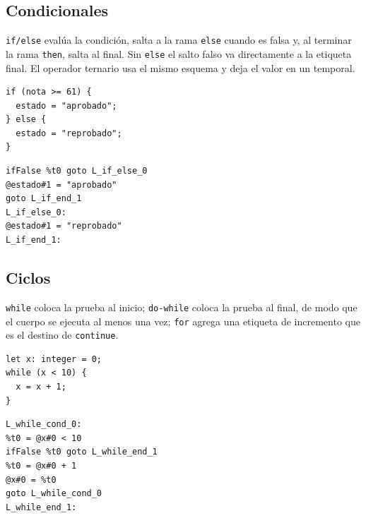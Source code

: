 \documentclass[11pt,a4paper]{article}
\begin{document}
\subsection{Condicionales}

\texttt{if/else} evalúa la condición, salta a la rama \texttt{else} cuando es
falsa y, al terminar la rama \texttt{then}, salta al final. Sin \texttt{else} el
salto falso va directamente a la etiqueta final. El operador ternario usa el
mismo esquema y deja el valor en un temporal.

\noindent
\begin{minipage}[t]{0.42\textwidth}
\begin{lstlisting}[language=Compiscript,style=sinnumero]
if (nota >= 61) {
  estado = "aprobado";
} else {
  estado = "reprobado";
}
\end{lstlisting}
\end{minipage}\hfill
\begin{minipage}[t]{0.52\textwidth}
\begin{lstlisting}[language=TAC,style=sinnumero]
%t0 = @nota#0 >= 61
ifFalse %t0 goto L_if_else_0
@estado#1 = "aprobado"
goto L_if_end_1
L_if_else_0:
@estado#1 = "reprobado"
L_if_end_1:
\end{lstlisting}
\end{minipage}

\subsection{Ciclos}

\texttt{while} coloca la prueba al inicio; \texttt{do-while} coloca la prueba al
final, de modo que el cuerpo se ejecuta al menos una vez; \texttt{for} agrega una
etiqueta de incremento que es el destino de \texttt{continue}.

\noindent
\begin{minipage}[t]{0.34\textwidth}
\begin{lstlisting}[language=Compiscript,style=sinnumero]
let x: integer = 0;
while (x < 10) {
  x = x + 1;
}
\end{lstlisting}
\end{minipage}\hfill
\begin{minipage}[t]{0.60\textwidth}
\begin{lstlisting}[language=TAC,style=sinnumero]
L_while_cond_0:
%t0 = @x#0 < 10
ifFalse %t0 goto L_while_end_1
%t0 = @x#0 + 1
@x#0 = %t0
goto L_while_cond_0
L_while_end_1:
\end{lstlisting}
\end{minipage}
\end{document}
